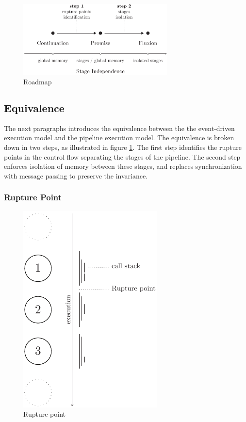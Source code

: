 

\begin{figure}[h!]
\begin{center}
\includegraphics[width=0.7\textwidth]{../resources/roadmap.pdf}
\end{center}
\caption{Roadmap}
\label{fig:roadmap}
\end{figure}

\subsection{Equivalence} \label{chapter4:equivalence}

The next paragraphs introduces the equivalence between the the event-driven execution model and the pipeline execution model.
The equivalence is broken down in two steps, as illustrated in figure \ref{fig:roadmap}.
The first step identifies the rupture points in the control flow separating the stages of the pipeline.
The second step enforces isolation of memory between these stages, and replaces synchronization with message passing to preserve the invariance.

\subsubsection{Rupture Point}

\begin{figure}
  \vspace{-10pt}
  \begin{center}
    \includegraphics[height=0.4\textwidth]{../resources/rupture-point.pdf}
    \caption{Rupture point}
    \label{fig:rupture-point}
  \end{center}
  \vspace{-10pt}
\end{figure}

